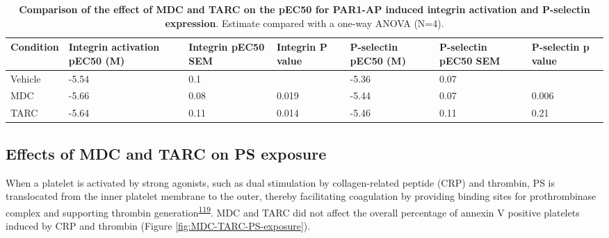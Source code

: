 \documentclass[11pt,twoside]{bristolthesis}
\begin{document}
\begin{landscape}\begin{table}

\caption[Comparison of the effect of MDC and TARC on the pEC50 for PAR1-AP induced integrin activation and P-selectin expression]{\label{tab:chemokines-integrin-pselectin}\textbf{Comparison of the effect of MDC and TARC on the pEC50 for PAR1-AP induced integrin activation and P-selectin expression}. Estimate compared with a one-way ANOVA (N=4).}
\centering
\begin{tabu} to 
\toprule
Condition & Integrin activation pEC50 (M) & Integrin pEC50 SEM & Integrin P value & P-selectin pEC50 (M) & P-selectin pEC50 SEM & P-selectin p value\\
\midrule
Vehicle & -5.54 & 0.1 &  & -5.36 & 0.07 & \\
MDC & -5.66 & 0.08 & 0.019 & -5.44 & 0.07 & 0.006\\
TARC & -5.64 & 0.11 & 0.014 & -5.46 & 0.11 & 0.21\\
\bottomrule
\end{tabu}
\end{table}
\end{landscape}
\hypertarget{effects-of-mdc-and-tarc-on-ps-exposure}{%
\subsection{Effects of MDC and TARC on PS exposure}\label{effects-of-mdc-and-tarc-on-ps-exposure}}

When a platelet is activated by strong agonists, such as dual stimulation by collagen-related peptide (CRP) and thrombin, PS is translocated from the inner platelet membrane to the outer, thereby facilitating coagulation by providing binding sites for prothrombinase complex and supporting thrombin generation\textsuperscript{\protect\hyperlink{ref-Reddy2020}{119}}. MDC and TARC did not affect the overall percentage of annexin V positive platelets induced by CRP and thrombin (Figure \ref{fig:MDC-TARC-PS-exposure}).
\end{document}
